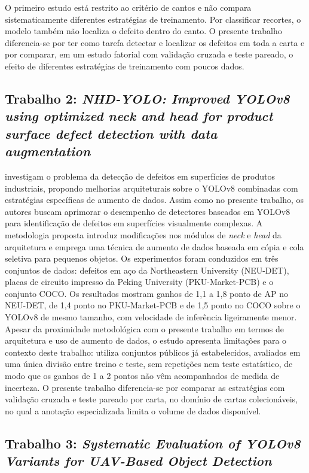 \documentclass[
    12pt,                %
    openright,           %
    oneside,             %
    a4paper,             %
    english,             %
    brazil               %
]{abntex2}
\begin{document}
O primeiro estudo está restrito ao critério de cantos e não compara sistematicamente diferentes estratégias de treinamento. Por classificar recortes, o modelo também não localiza o defeito dentro do canto. O presente trabalho diferencia-se por ter como tarefa detectar e localizar os defeitos em toda a carta e por comparar, em um estudo fatorial com validação cruzada e teste pareado, o efeito de diferentes estratégias de treinamento com poucos dados.

\subsection{Trabalho 2: \textit{NHD-YOLO: Improved YOLOv8 using 
optimized neck and head for product surface defect detection with 
data augmentation}}

 investigam o problema da detecção de defeitos 
em superfícies de produtos industriais, propondo melhorias arquiteturais 
sobre o YOLOv8 combinadas com estratégias específicas de aumento de 
dados. Assim como no presente trabalho, os autores buscam aprimorar 
o desempenho de detectores baseados em YOLOv8 para identificação de 
defeitos em superfícies visualmente complexas. A metodologia proposta 
introduz modificações nos módulos de \textit{neck} e \textit{head} da 
arquitetura e emprega uma técnica de aumento de dados baseada em 
cópia e cola seletiva para pequenos objetos. Os experimentos foram 
conduzidos em três conjuntos de dados: defeitos em aço da Northeastern 
University (NEU-DET), placas de circuito impresso da Peking University 
(PKU-Market-PCB) e o conjunto COCO. Os resultados mostram ganhos de 1,1
a 1,8 ponto de AP no NEU-DET, de 1,4 ponto no PKU-Market-PCB e de 1,5
ponto no COCO sobre o YOLOv8 de mesmo tamanho, com velocidade de
inferência ligeiramente menor. Apesar da proximidade metodológica com o presente trabalho 
em termos de arquitetura e uso de aumento de dados, o estudo apresenta 
limitações para o contexto deste trabalho: utiliza conjuntos públicos já estabelecidos, avaliados em uma única divisão
entre treino e teste, sem repetições nem teste estatístico, de modo que
os ganhos de 1 a 2 pontos não vêm acompanhados de medida de incerteza.
O presente trabalho diferencia-se por comparar as estratégias com
validação cruzada e teste pareado por carta, no domínio de cartas
colecionáveis, no qual a anotação especializada limita o volume de
dados disponível.

\subsection{Trabalho 3: \textit{Systematic Evaluation of YOLOv8 Variants for UAV-Based Object Detection}}
\end{document}
